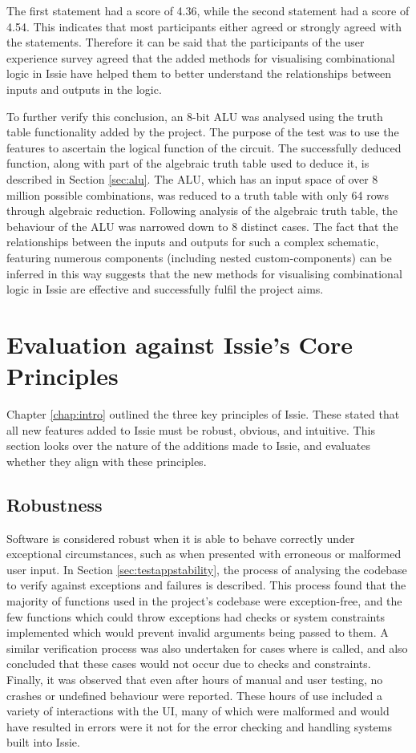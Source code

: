 The first statement had a score of 4.36, while the second statement had a score of 4.54. This indicates that most participants either agreed or strongly agreed with the statements. Therefore it can be said that the participants of the user experience survey agreed that the added methods for visualising combinational logic in Issie have helped them to better understand the relationships between inputs and outputs in the logic. 

To further verify this conclusion, an 8-bit ALU was analysed using the truth table functionality added by the project. The purpose of the test was to use the features to ascertain the logical function of the circuit. The successfully deduced function, along with part of the algebraic truth table used to deduce it, is described in Section \ref{sec:alu}. The ALU, which has an input space of over 8 million possible combinations, was reduced to a truth table with only 64 rows through algebraic reduction. Following analysis of the algebraic truth table, the behaviour of the ALU was narrowed down to 8 distinct cases. 
The fact that the relationships between the inputs and outputs for such a complex schematic, featuring numerous components (including nested custom-components) can be inferred in this way suggests that the new methods for visualising combinational logic in Issie are effective and successfully fulfil the project aims.

\section{Evaluation against Issie's Core Principles}
Chapter \ref{chap:intro} outlined the three key principles of Issie. These stated that all new features added to Issie must be robust, obvious, and intuitive. This section looks over the nature of the additions made to Issie, and evaluates whether they align with these principles.
\subsection{Robustness}
Software is considered robust when it is able to behave correctly under exceptional circumstances, such as when presented with erroneous or malformed user input. In Section \ref{sec:testappstability}, the process of analysing the codebase to verify against exceptions and failures is described. This process found that the majority of functions used in the project's codebase were exception-free, and the few functions which could throw exceptions had checks or system constraints implemented which would prevent invalid arguments being passed to them. A similar verification process was also undertaken for cases where  is called, and also concluded that these cases would not occur due to checks and constraints. Finally, it was observed that even after hours of manual and user testing, no crashes or undefined behaviour were reported. These hours of use included a variety of interactions with the UI, many of which were malformed and would have resulted in errors were it not for the error checking and handling systems built into Issie.

